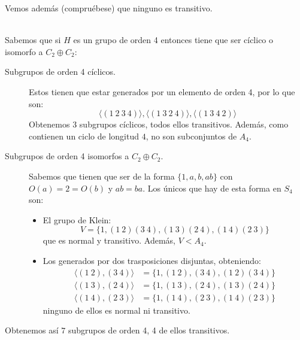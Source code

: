 \begin{description}
        Vemos además (compruébese) que ninguno es transitivo.
    \item [Subgrupos de orden 4.]~\\
        Sabemos que si $H$ es un grupo de orden 4 entonces tiene que ser cíclico o isomorfo a $C_2\oplus C_2$:
        \begin{description}
            \item [Subgrupos de orden 4 cíclicos.] Estos tienen que estar generados por un elemento de orden 4, por lo que son:
                \begin{equation*}
                    \langle (1\ 2\ 3\ 4) \rangle , \langle (1\ 3\ 2\ 4) \rangle , \langle (1\ 3\ 4\ 2) \rangle 
                \end{equation*}
                Obtenemos 3 subgrupos cíclicos, todos ellos transitivos. Además, como contienen un ciclo de longitud $4$, no son subconjuntos de $A_4$.
            \item [Subgrupos de orden 4 isomorfos a $C_2\oplus C_2$.] Sabemos que tienen que ser de la forma $\{1,a,b,ab\}$ con $O(a) = 2 = O(b)$ y $ab = ba$. Los únicos que hay de esta forma en $S_4$ son:
                \begin{itemize}
                    \item El grupo de Klein:
                        \begin{equation*}
                            V = \{1, (1\ 2)(3\ 4), (1\ 3)(2\ 4), (1\ 4)(2\ 3)\}
                        \end{equation*}
                        que es normal y transitivo. Además, $V<A_4$.
                    \item Los generados por dos trasposiciones disjuntas, obteniendo:
                        \begin{align*}
                            \langle (1\ 2),(3\ 4) \rangle &= \{1, (1\ 2), (3\ 4), (1\ 2)(3\ 4)\} \\
                            \langle (1\ 3),(2\ 4) \rangle &= \{1, (1\ 3), (2\ 4), (1\ 3)(2\ 4)\} \\
                            \langle (1\ 4),(2\ 3) \rangle &= \{1, (1\ 4), (2\ 3), (1\ 4)(2\ 3)\}
                        \end{align*}
                        ninguno de ellos es normal ni transitivo.
                \end{itemize}
        \end{description}
        Obtenemos así $7$ subgrupos de orden 4, 4 de ellos transitivos.
    \item [Subgrupos de orden 6.]~\\

\end{description}
